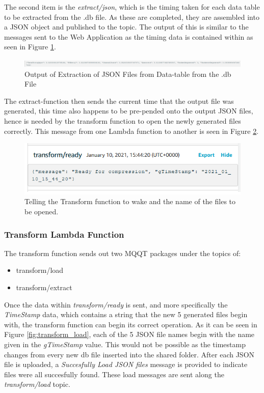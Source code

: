 The second item is the \textit{extract/json}, which is the timing taken for each data table to be extracted from the .db file. As these are completed, they are assembled into a JSON object and published to the topic. The output of this is similar to the messages sent to the Web Application as the timing data is contained within as seen in Figure \ref{fig:extract_json}.

\begin{figure}[ht]
    \centering
    \includegraphics[width=1\linewidth]{pages/Chapter5/Chapter 5 images/Lambda-Fns/extract_json.png}
    \caption{Output of Extraction of JSON Files from Data-table from the .db File}
    \label{fig:extract_json}
\end{figure}

The extract-function then sends the current time that the output file was generated, this time also happens to be pre-pended onto the output JSON files, hence is needed by the transform function to open the newly generated files correctly. This message from one Lambda function to another is seen in Figure \ref{fig:transform_ready}.

\begin{figure}[ht]
    \centering
    \includegraphics[width=0.7\linewidth]{pages/Chapter5/Chapter 5 images/Lambda-Fns/transform_ready.png}
    \caption{Telling the Transform function to wake and the name of the files to be opened.}
    \label{fig:transform_ready}
\end{figure}

\subsubsection{Transform Lambda Function}
The transform function sends out two MQQT packages under the topics of:
\begin{itemize}
    \item transform/load
    \item transform/extract
\end{itemize}

Once the data within \textit{transform/ready} is sent, and more specifically the \textit{TimeStamp} data, which contains a string that the new 5 generated files begin with, the transform function can begin its correct operation. As it can be seen in Figure \ref{fig:transform_load}, each of the 5 JSON file names begin with the name given in the \textit{gTimeStamp} value. This would not be possible as the timestamp changes from every new db file inserted into the shared folder. After each JSON file is uploaded, a \textit{Succesfully Load JSON files} message is provided to indicate files were all succesfully found. These load messages are sent along the \textit{transform/load} topic.

